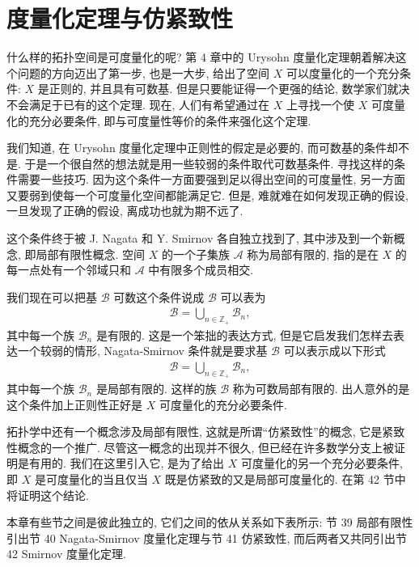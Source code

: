 \documentclass[../main.tex]{subfiles}
\begin{document}
\chapter{度量化定理与仿紧致性}\label{chapter:ch06}

什么样的拓扑空间是可度量化的呢? 第 4 章中的 Urysohn 度量化定理朝着解决这个问题的方向迈出了第一步, 也是一大步, 给出了空间 $X$ 可以度量化的一个充分条件: $X$ 是正则的, 并且具有可数基. 但是只要能证得一个更强的结论, 数学家们就决不会满足于已有的这个定理. 现在, 人们有希望通过在 $X$ 上寻找一个使 $X$ 可度量化的充分必要条件, 即与可度量性等价的条件来强化这个定理.

我们知道, 在 Urysohn 度量化定理中正则性的假定是必要的, 而可数基的条件却不是. 于是一个很自然的想法就是用一些较弱的条件取代可数基条件. 寻找这样的条件需要一些技巧. 因为这个条件一方面要强到足以得出空间的可度量性, 另一方面又要弱到使每一个可度量化空间都能满足它. 但是, 难就难在如何发现正确的假设, 一旦发现了正确的假设, 离成功也就为期不远了.

这个条件终于被 J. Nagata 和 Y. Smirnov 各自独立找到了, 其中涉及到一个新概念, 即局部有限性概念. 空间 $X$ 的一个子集族 $\mathcal{A}$ 称为局部有限的, 指的是在 $X$ 的每一点处有一个邻域只和 $\mathcal{A}$ 中有限多个成员相交.

我们现在可以把基 $\mathcal{B}$ 可数这个条件说成 $\mathcal{B}$ 可以表为
\begin{align*}
\mathcal{B}=\bigcup_{n\in\mathbb{Z}_+}\mathcal{B}_n,
\end{align*}
其中每一个族 $\mathcal{B}_n$ 是有限的. 这是一个笨拙的表达方式, 但是它启发我们怎样去表达一个较弱的情形, Nagata-Smirnov 条件就是要求基 $\mathcal{B}$ 可以表示成以下形式
\begin{align*}
\mathcal{B}=\bigcup_{n\in\mathbb{Z}_+}\mathcal{B}_n,
\end{align*}
其中每一个族 $\mathcal{B}_n$ 是局部有限的. 这样的族 $\mathcal{B}$ 称为可数局部有限的. 出人意外的是这个条件加上正则性正好是 $X$ 可度量化的充分必要条件.

拓扑学中还有一个概念涉及局部有限性, 这就是所谓``仿紧致性''的概念, 它是紧致性概念的一个推广. 尽管这一概念的出现并不很久, 但已经在许多数学分支上被证明是有用的. 我们在这里引入它, 是为了给出 $X$ 可度量化的另一个充分必要条件, 即 $X$ 是可度量化的当且仅当 $X$ 既是仿紧致的又是局部可度量化的. 在第 42 节中将证明这个结论.

本章有些节之间是彼此独立的, 它们之间的依从关系如下表所示: 节 39 局部有限性引出节 40 Nagata-Smirnov 度量化定理与节 41 仿紧致性, 而后两者又共同引出节 42 Smirnov 度量化定理.





\end{document}
